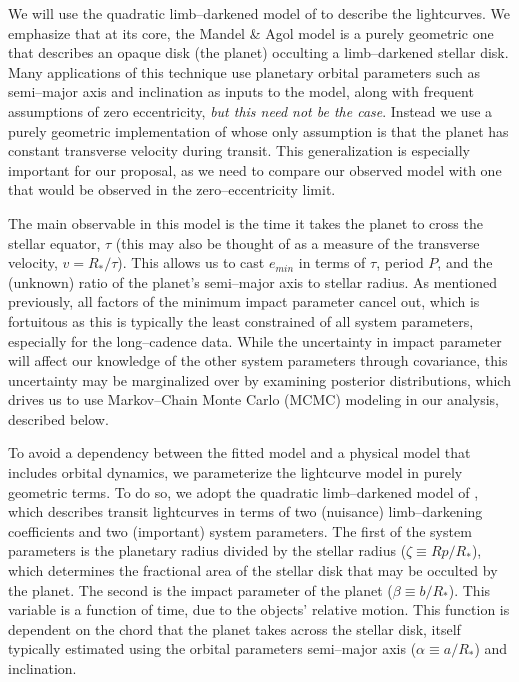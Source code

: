 We will use the quadratic limb--darkened model
of \cite{2002ApJ...580L.171M} to describe the lightcurves.  We
emphasize that at its core, the Mandel \& Agol model is a purely
geometric one that describes an opaque disk (the planet) occulting a
limb--darkened stellar disk.  Many applications of this technique use
planetary orbital parameters such as semi--major axis and inclination
as inputs to the model, along with frequent assumptions of zero
eccentricity, {\it but this need not be the case}.  Instead we use a
purely geometric implementation of \cite{2002ApJ...580L.171M} whose
only assumption is that the planet has constant transverse velocity
during transit.  This generalization is especially important for our
proposal, as we need to compare our observed model with one that would
be observed in the zero--eccentricity limit.

The main observable in this model is the time it takes the planet to
cross the stellar equator, $\tau$ (this may also be thought of as a
measure of the transverse velocity, $v = R_*/\tau$).  This allows us
to cast $e_{min}$ in terms of $\tau$, period $P$, and the (unknown)
ratio of the planet's semi--major axis to stellar radius.  As
mentioned previously, all factors of the minimum impact parameter
cancel out, which is fortuitous as this is typically the least
constrained of all system parameters, especially for the
long--cadence \kepler data.  While the uncertainty in impact parameter
will affect our knowledge of the other system parameters through
covariance, this uncertainty may be marginalized over by examining
posterior distributions, which drives us to use Markov--Chain Monte
Carlo (MCMC) modeling in our analysis, described below.


\medskip
{\centerline{}}
\smallskip

To avoid a dependency between the fitted model and a physical model
that includes orbital dynamics, we parameterize the lightcurve model
in purely geometric terms.  To do so, we adopt the quadratic
limb--darkened model of \cite{2002ApJ...580L.171M}, which describes
transit lightcurves in terms of two (nuisance) limb--darkening
coefficients and two (important) system parameters.  The first of the
system parameters is the planetary radius divided by the stellar
radius ($\zeta \equiv Rp/R_*$), which determines the fractional area
of the stellar disk that may be occulted by the planet.  The second is
the impact parameter of the planet ($\beta \equiv b/R_*$).  This
variable is a function of time, due to the objects' relative motion.
This function is dependent on the chord that the planet takes across
the stellar disk, itself typically estimated using the orbital
parameters semi--major axis ($\alpha \equiv a/R_*$) and inclination.

